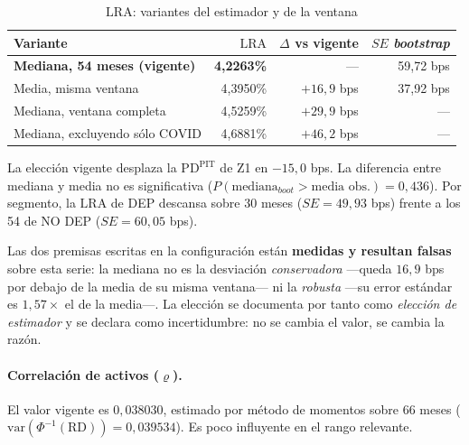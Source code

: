 \documentclass[12pt, a4paper]{article}
\newcommand{\PDPIT}{\ensuremath{\mathrm{PD}^{\mathrm{PIT}}}}
\newcommand{\RD}{\ensuremath{\mathrm{RD}}}
\newcommand{\LRA}{\ensuremath{\mathrm{LRA}}}
\renewcommand{\rho}{\ensuremath{\varrho}}
\newcommand{\Norm}{\ensuremath{\Phi}}
\begin{document}
\begin{table}[H]
\centering
\caption{\LRA: variantes del estimador y de la ventana}
\label{tab:sens_lra}
\small
\begin{tabular}{lrrr}
\toprule
\textbf{Variante} & \textbf{\LRA} & \textbf{$\Delta$ vs vigente} & \textbf{$SE$ \emph{bootstrap}} \\
\midrule
\textbf{Mediana, 54 meses (vigente)} & \textbf{4,2263\%} & --- & 59,72 bps \\
Media, misma ventana                 & 4,3950\% & $+16{,}9$ bps & 37,92 bps \\
Mediana, ventana completa            & 4,5259\% & $+29{,}9$ bps & --- \\
Mediana, excluyendo sólo COVID       & 4,6881\% & $+46{,}2$ bps & --- \\
\bottomrule
\end{tabular}
\end{table}

\noindent La elección vigente desplaza la $\PDPIT$ de Z1 en $-15{,}0$ bps. La diferencia entre mediana y media no es significativa ($P(\text{mediana}_{boot}>\text{media obs.})=0{,}436$). Por segmento, la \LRA{} de DEP descansa sobre 30 meses ($SE=49{,}93$ bps) frente a los 54 de NO DEP ($SE=60{,}05$ bps).

\noindent Las dos premisas escritas en la configuración están \textbf{medidas y resultan falsas}
sobre esta serie: la mediana no es la desviación \emph{conservadora} ---queda $16{,}9$ bps por
debajo de la media de su misma ventana--- ni la \emph{robusta} ---su error estándar es
$1{,}57\times$ el de la media---. La elección se documenta por tanto como \emph{elección de
estimador} y se declara como incertidumbre: no se cambia el valor, se cambia la razón.

\paragraph{Correlación de activos ($\rho$).} El valor vigente es $0{,}038030$, estimado por método
de momentos sobre 66 meses ($\mathrm{var}(\Norm^{-1}(\RD))=0{,}039534$). Es poco influyente en el
rango relevante.
\end{document}
